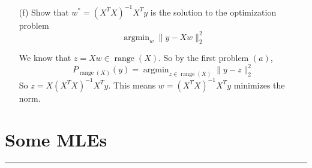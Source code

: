 \documentclass{article}
\begin{document}
\begin{itemize}
        \item [(f)] Show that $w^{*} = (X^{T}X)^{-1}X^{T}y$ is the solution to the optimization problem
            \begin{equation*}
                \mathop{argmin}_{w} \lVert y - Xw \rVert^{2}_{2}
            \end{equation*}
            \begin{answer}
                We know that $z = Xw \in \mathop{range}(X)$. So by the first problem $(a)$,
                    \begin{equation*}
                        P_{\mathop{range}(X)}(y) = \mathop{argmin}_{z \in \mathop{range}(X)} \lVert y - z \rVert^{2}_{2}
                    \end{equation*}
                So $z = X(X^{T}X)^{-1}X^{T}y$. This means $w = (X^{T}X)^{-1}X^{T}y$ minimizes the norm.
            \end{answer}
    \end{itemize}

\newpage
\section*{Some MLEs}
\hrule
\end{document}
